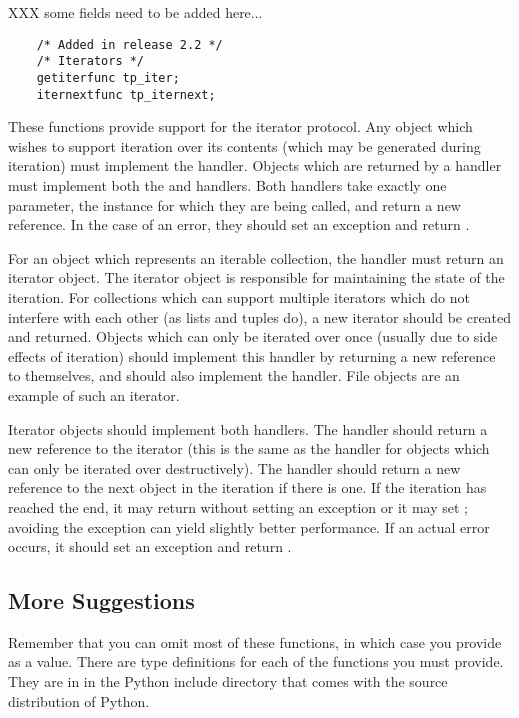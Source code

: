 XXX some fields need to be added here...


\begin{verbatim}
    /* Added in release 2.2 */
    /* Iterators */
    getiterfunc tp_iter;
    iternextfunc tp_iternext;
\end{verbatim}

These functions provide support for the iterator protocol.  Any object
which wishes to support iteration over its contents (which may be
generated during iteration) must implement the 
handler.  Objects which are returned by a  handler must
implement both the  and  handlers.
Both handlers take exactly one parameter, the instance for which they
are being called, and return a new reference.  In the case of an
error, they should set an exception and return \NULL.

For an object which represents an iterable collection, the
 handler must return an iterator object.  The iterator
object is responsible for maintaining the state of the iteration.  For
collections which can support multiple iterators which do not
interfere with each other (as lists and tuples do), a new iterator
should be created and returned.  Objects which can only be iterated
over once (usually due to side effects of iteration) should implement
this handler by returning a new reference to themselves, and should
also implement the  handler.  File objects are an
example of such an iterator.

Iterator objects should implement both handlers.  The 
handler should return a new reference to the iterator (this is the
same as the  handler for objects which can only be
iterated over destructively).  The  handler should
return a new reference to the next object in the iteration if there is
one.  If the iteration has reached the end, it may return \NULL{}
without setting an exception or it may set ;
avoiding the exception can yield slightly better performance.  If an
actual error occurs, it should set an exception and return \NULL.

\subsection{More Suggestions}

Remember that you can omit most of these functions, in which case you
provide  as a value.  There are type definitions for each of
the functions you must provide.  They are in  in the
Python include directory that comes with the source distribution of
Python.

